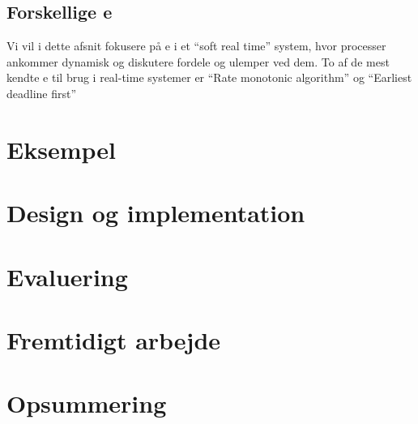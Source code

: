 \subsection{Forskellige \sched e}
Vi vil i dette afsnit fokusere på \sched e i et ``soft real time'' system,   hvor processer ankommer dynamisk og diskutere fordele og ulemper ved dem.
To af de mest kendte \sched e til brug i real-time systemer er ``Rate monotonic algorithm''\cite{lehoczky1989rate,liu1973scheduling} og ``Earliest deadline first''\cite{liu1973scheduling}


  \section{Eksempel}
  \section{Design og implementation}
  \section{Evaluering}
  \section{Fremtidigt arbejde}
  \section{Opsummering}
